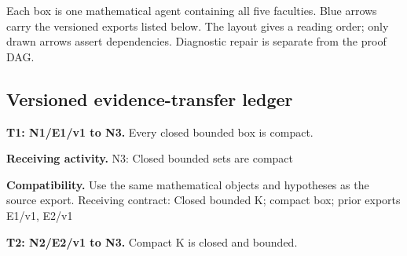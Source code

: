 \documentclass[preprint,12pt,aps,pra,showkeys,amsmath,amssymb,superscriptaddress,floatfix]{revtex4-2}
\theoremstyle{definition}
\theoremstyle{remark}
\newcommand{\field}[2]{\par\smallskip\noindent\textbf{#1.} #2\par}
\begin{document}
\begin{center}\end{center}

Each box is one mathematical agent containing all five faculties. Blue
arrows carry the versioned exports listed below. The layout gives a
reading order; only drawn arrows assert dependencies. Diagnostic repair
is separate from the proof DAG.

\subsection{Versioned evidence-transfer ledger}

\begingroup\small\linespread{1.05}\selectfont

\field{T1: N1/E1/v1 to N3}{Every closed bounded box is compact.}

\field{Receiving activity}{N3: Closed bounded sets are compact}

\field{Compatibility}{Use the same mathematical objects and hypotheses as the source export.
Receiving contract: Closed bounded K; compact box; prior exports E1/v1,
E2/v1}

\field{T2: N2/E2/v1 to N3}{Compact K is closed and bounded.}
\end{document}
